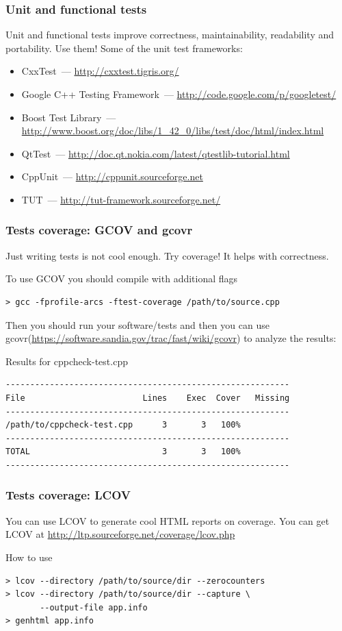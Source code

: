 \documentclass{beamer}
\begin{document}
\begin{frame}
\frametitle{Unit and functional tests}
Unit and functional tests improve correctness, maintainability, readability and portability. Use them! Some of the unit test frameworks:
\begin{itemize}
\item CxxTest~--- \url{http://cxxtest.tigris.org/}
\item Google C++ Testing Framework~--- \url{http://code.google.com/p/googletest/}
\item Boost Test Library~--- \url{http://www.boost.org/doc/libs/1_42_0/libs/test/doc/html/index.html}
\item QtTest~--- \url{http://doc.qt.nokia.com/latest/qtestlib-tutorial.html}
\item CppUnit~--- \url{http://cppunit.sourceforge.net}
\item TUT~--- \url{http://tut-framework.sourceforge.net/}
\end{itemize}
\end{frame}

\begin{frame}[fragile]
\frametitle{Tests coverage: GCOV and gcovr}
Just writing tests is not cool enough. Try coverage! It helps with correctness.
\begin{exampleblock}{To use GCOV you should compile with additional flags}
\begin{Verbatim}[fontsize=\small]
> gcc -fprofile-arcs -ftest-coverage /path/to/source.cpp
\end{Verbatim}
\end{exampleblock}
Then you should run your software/tests and then you can use gcovr(\url{https://software.sandia.gov/trac/fast/wiki/gcovr}) to analyze the results:
\begin{exampleblock}{Results for cppcheck-test.cpp}
\begin{Verbatim}[fontsize=\small]
----------------------------------------------------------
File                        Lines    Exec  Cover   Missing
----------------------------------------------------------
/path/to/cppcheck-test.cpp      3       3   100%   
----------------------------------------------------------
TOTAL                           3       3   100%
----------------------------------------------------------
\end{Verbatim}
\end{exampleblock}
\end{frame}

\begin{frame}[fragile]
\frametitle{Tests coverage: LCOV}
You can use LCOV to generate cool HTML reports on coverage. You can get LCOV at \url{http://ltp.sourceforge.net/coverage/lcov.php}
\begin{exampleblock}{How to use}
\begin{verbatim}
> lcov --directory /path/to/source/dir --zerocounters
> lcov --directory /path/to/source/dir --capture \
       --output-file app.info
> genhtml app.info
\end{verbatim}
\end{exampleblock}
\end{frame}
\end{document}
